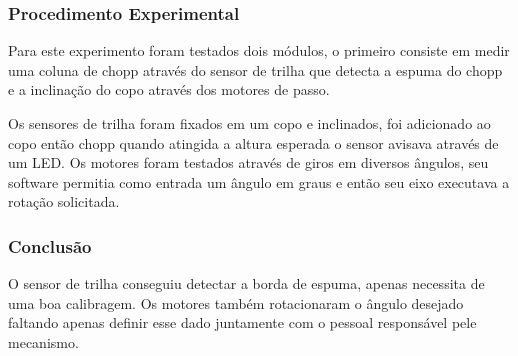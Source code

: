\begin{anexosenv}
\begin{itemize}
\end{itemize}

\subsubsection{Procedimento Experimental}

    Para este experimento foram testados dois módulos, o primeiro consiste em medir uma coluna de chopp através do sensor de trilha que detecta a espuma do chopp e a inclinação do copo através dos motores de passo.

    Os sensores de trilha foram fixados em um copo e inclinados, foi adicionado ao copo então chopp quando atingida a altura esperada o sensor avisava através de um LED.
    Os motores foram testados através de giros em diversos ângulos, seu software permitia como entrada um ângulo em graus e então seu eixo executava a rotação solicitada.

\subsubsection{Conclusão}

   O sensor de trilha conseguiu detectar a borda de espuma, apenas necessita de uma boa calibragem. Os motores também rotacionaram o ângulo desejado faltando apenas definir esse dado juntamente com o pessoal responsável pele mecanismo.

\noindent

\end{anexosenv}